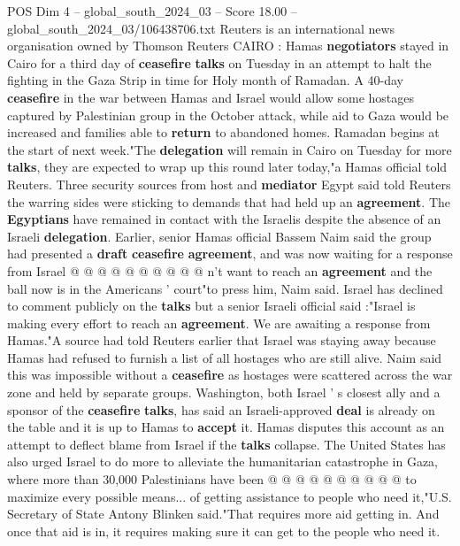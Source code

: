 \begin{textsample}{POS Dim 4 – global\_south\_2024\_03 – Score 18.00 – global\_south\_2024\_03/106438706.txt}  \label{ex:f4_pos_110}
Reuters is an international news organisation owned by Thomson Reuters CAIRO : Hamas \textbf{negotiators} stayed in Cairo for a third day of \textbf{ceasefire} \textbf{talks} on Tuesday in an attempt to halt the fighting in the Gaza Strip in time for Holy month of Ramadan.
A 40-day \textbf{ceasefire} in the war between Hamas and Israel would allow some hostages captured by Palestinian group in the October attack, while aid to Gaza would be increased and families able to \textbf{return} to abandoned homes.
Ramadan begins at the start of next week."The \textbf{delegation} will remain in Cairo on Tuesday for more \textbf{talks}, they are expected to wrap up this round later today,"a Hamas official told Reuters.
Three security sources from host and \textbf{mediator} Egypt said told Reuters the warring sides were sticking to demands that had held up an \textbf{agreement}.
The \textbf{Egyptians} have remained in contact with the Israelis despite the absence of an Israeli \textbf{delegation}.
Earlier, senior Hamas official Bassem Naim said the group had presented a \textbf{draft} \textbf{ceasefire} \textbf{agreement}, and was now waiting for a response from Israel @ @ @ @ @ @ @ @ @ @ n't want to reach an \textbf{agreement} and the ball now is in the Americans ' court"to press him, Naim said.
Israel has declined to comment publicly on the \textbf{talks} but a senior Israeli official said :"Israel is making every effort to reach an \textbf{agreement}.
We are awaiting a response from Hamas."A source had told Reuters earlier that Israel was staying away because Hamas had refused to furnish a list of all hostages who are still alive.
Naim said this was impossible without a \textbf{ceasefire} as hostages were scattered across the war zone and held by separate groups.
Washington, both Israel ' s closest ally and a sponsor of the \textbf{ceasefire} \textbf{talks}, has said an Israeli-approved \textbf{deal} is already on the table and it is up to Hamas to \textbf{accept} it.
Hamas disputes this account as an attempt to deflect blame from Israel if the \textbf{talks} collapse.
The United States has also urged Israel to do more to alleviate the humanitarian catastrophe in Gaza, where more than 30,000 Palestinians have been @ @ @ @ @ @ @ @ @ @ to maximize every possible means... of getting assistance to people who need it,"U.S.
Secretary of State Antony Blinken said."That requires more aid getting in.
And once that aid is in, it requires making sure it can get to the people who need it.

\end{textsample}
